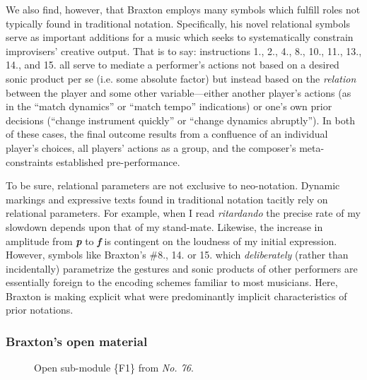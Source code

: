        We also find, however, that Braxton employs many symbols which fulfill roles not typically found in traditional notation. Specifically, his novel relational symbols serve as important additions for a music which seeks to systematically constrain improvisers' creative output. That is to say: instructions 1., 2., 4., 8., 10., 11., 13., 14., and 15. all serve to mediate a performer's actions not based on a desired sonic product per se (i.e. some absolute factor) but instead based on the \textit{relation} between the player and some other variable---either another player's actions (as in the ``match dynamics'' or ``match tempo'' indications) or one's own prior decisions (``change instrument quickly'' or ``change dynamics abruptly''). In both of these cases, the final outcome results from a confluence of an individual player's choices, all players' actions as a group, and the composer's meta-constraints established pre-performance.
    
       To be sure, relational parameters are not exclusive to neo-notation. Dynamic markings and expressive texts found in traditional notation tacitly rely on relational parameters. For example, when I read \textit{ritardando} the precise rate of my slowdown depends upon that of my stand-mate. Likewise, the increase in amplitude from \textbf{\textit{p}} to \textbf{\textit{f}} is contingent on the loudness of my initial expression. However, symbols like Braxton's \#8., 14. or 15. which \textit{deliberately} (rather than incidentally) parametrize the gestures and sonic products of other performers are essentially foreign to the encoding schemes familiar to most musicians. Here, Braxton is making explicit what were predominantly implicit characteristics of prior notations.
    
    \subsubsection{Braxton's open material}

            \begin{figure} 
                \centering
                \captionsetup{width=.55\textwidth}
                \caption[Open sub-module \{F1\} from \textit{No. 76}.]{Open sub-module \{F1\} from \textit{No. 76}.\footnotemark}
                \label{fig:openf1}
            \end{figure}
            
